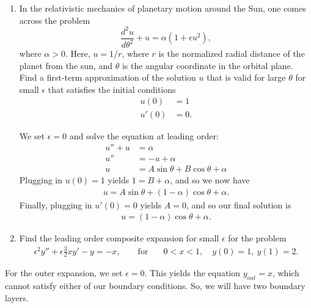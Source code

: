 \documentclass[10pt,letterpaper]{report}
\begin{document}
\begin{enumerate}
\addtocounter{enumi}{1}

\item \begin{qbox}
In the relativistic mechanics of planetary motion around the Sun, one comes across the problem
\[
\frac{d^2 u}{d\theta^2} + u = \alpha\left(1 + \epsilon u^2\right),
\]
where $\alpha > 0$. Here, $u = 1/r$, where $r$ is the normalized radial distance of the planet from the sun, and $\theta$ is the angular coordinate in the orbital plane. Find a first-term approximation of
the solution $u$ that is valid for large $\theta$ for small $\epsilon$ that satisfies the initial conditions
\begin{align*}
    u(0) &= 1 \\
    u'(0) &= 0.
\end{align*}
\end{qbox}

We set $\epsilon = 0$ and solve the equation at leading order:
\begin{align*}
    u'' + u &= \alpha \\
    u'' &= -u + \alpha \\
    u &= A\sin\theta + B\cos\theta + \alpha
\end{align*}
Plugging in $u(0) = 1$ yields $1 = B + \alpha$, and so we now have
\begin{align*}
    u = A\sin\theta + (1- \alpha)\cos\theta + \alpha.
\end{align*}
Finally, plugging in $u'(0) = 0$ yields $A = 0$, and so our final solution is
\begin{align*}
    u = (1- \alpha)\cos\theta + \alpha.
\end{align*}

\item \begin{qbox}
Find the leading order composite expansion for small $\epsilon$ for the problem
\begin{align*}
    \epsilon^2 y'' + \epsilon\frac{3}{2}xy' - y = -x, \qquad \textrm{for}\quad &0 < x < 1, \quad y(0) = 1,\ y(1) = 2.
\end{align*}
\end{qbox}
\end{enumerate}

For the outer expansion, we set $\epsilon = 0$. This yields the equation $y_{out} = x$, which cannot satisfy either of our boundary conditions. So, we will have two boundary layers.
\end{document}
